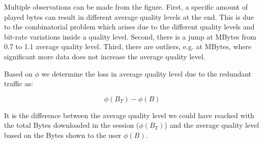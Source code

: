 Multiple observations can be made from the figure. 
First, a specific amount of played bytes can result in different average quality levels at the end. 
This is due to the combinatorial problem which arises due to the different quality levels and bit-rate variations inside a quality level.
Second, there is a jump at \unit[20]{MBytes} from 0.7 to 1.1 average quality level.
Third, there are outliers, e.g. at \unit[27]{MBytes}, where significant more data does not increase the average quality level.

Based on $\phi$ we determine the loss in average quality level due to the redundant traffic as:

\begin{equation}
\phi(B_T) - \phi(B)
\end{equation}

It is the difference between the average quality level we could have reached with the total Bytes downloaded in the session ($\phi(B_T)$) and the average quality level based on the Bytes shown to the user $\phi(B)$.
